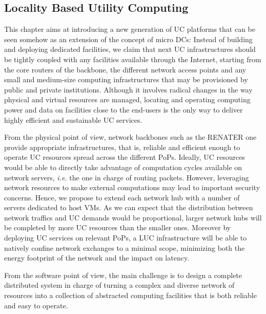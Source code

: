 \subsection{Locality Based Utility Computing}


This chapter aims at introducing a new generation of UC platforms that can be
seen somehow as an extension of the concept of micro DCs: 
Instead of building and deploying dedicated facilities, we claim that next UC
infrastructures should be tightly coupled with any facilities available through
the Internet, starting from the core routers of the backbone, the different
network access points and any small and medium-size computing infrastructures
that may be provisioned by public and private institutions. 
 Although it involves radical changes in the way
physical and virtual resources are managed, locating and operating computing
power and data on
facilities close to the end-users is the only way to deliver highly efficient
and sustainable UC services. 

From the physical point of view, network backbones such as the RENATER one provide
appropriate infrastructures, that is, reliable and efficient enough to operate UC
resources spread across the different PoPs. Ideally, UC resources would be able to
directly
take advantage of computation cycles available on network servers, \textit{i.e.} the one
in charge of routing packets. However, leveraging network resources to make external
computations may lead to important security concerns. Hence, we propose to extend each
network hub with a number of servers dedicated to host VMs. As we can expect that the
distribution between network traffics and UC demands would be proportional, larger network
hubs will be completed by more UC resources than the smaller ones. Moreover by deploying
UC services on relevant PoPs, a LUC infrastructure will be able to natively confine
network exchanges to a minimal scope, minimizing both the energy footprint of the network
and the impact on latency.


From the software point of view, the main challenge is to design a complete distributed
system in charge of turning a complex and diverse network of resources into a collection
of abstracted computing facilities that is both reliable and easy to operate.


